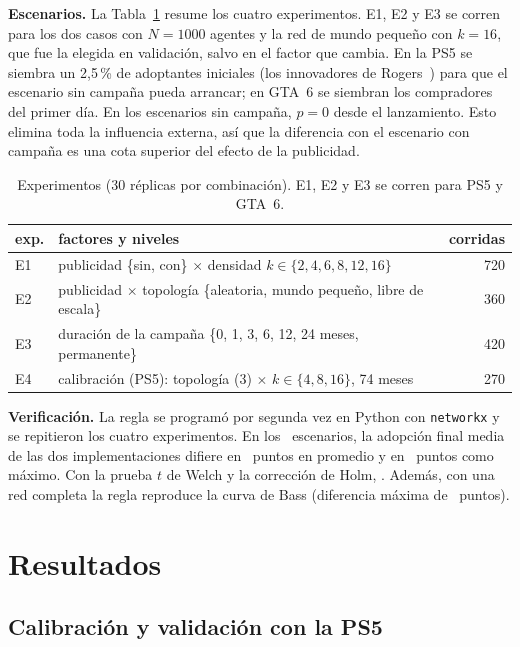 \documentclass{llncs}
\begin{document}
\textbf{Escenarios.} La Tabla~\ref{tab:experimentos} resume los cuatro experimentos. E1, E2 y E3 se corren para los dos casos con $N=1000$ agentes y la red de mundo pequeño con $k=16$, que fue la elegida en validación, salvo en el factor que cambia. En la PS5 se siembra un 2,5\,\% de adoptantes iniciales (los innovadores de Rogers~\cite{rogers2003}) para que el escenario sin campaña pueda arrancar; en GTA~6 se siembran los compradores del primer día. En los escenarios sin campaña, $p=0$ desde el lanzamiento. Esto elimina toda la influencia externa, así que la diferencia con el escenario con campaña es una cota superior del efecto de la publicidad.

\begin{table}[htb]
  \centering
  \caption{Experimentos (30 réplicas por combinación). E1, E2 y E3 se corren para PS5 y GTA~6.}
  \label{tab:experimentos}
  \footnotesize
  \setlength{\tabcolsep}{4pt}
  \begin{tabular}{llr}
    \toprule
    exp. & factores y niveles & corridas \\
    \midrule
    E1 & publicidad \{sin, con\} $\times$ densidad $k\in\{2,4,6,8,12,16\}$ & 720 \\
    E2 & publicidad $\times$ topología \{aleatoria, mundo pequeño, libre de escala\} & 360 \\
    E3 & duración de la campaña \{0, 1, 3, 6, 12, 24 meses, permanente\} & 420 \\
    E4 & calibración (PS5): topología (3) $\times$ $k\in\{4,8,16\}$, 74 meses & 270 \\
    \bottomrule
  \end{tabular}
\end{table}

\textbf{Verificación.} La regla se programó por segunda vez en Python con \texttt{networkx} y se repitieron los cuatro experimentos. En los \cifraVerifEscenarios\ escenarios, la adopción final media de las dos implementaciones difiere en \cifraVerifDifMedia\ puntos en promedio y en \cifraVerifDifMax\ puntos como máximo. Con la prueba $t$ de Welch y la corrección de Holm, \cifraVerifHolm. Además, con una red completa la regla reproduce la curva de Bass (diferencia máxima de \cifraVerifBassMax\ puntos).

\section{Resultados}
\label{sec:resultados}

\subsection{Calibración y validación con la PS5}
\end{document}
